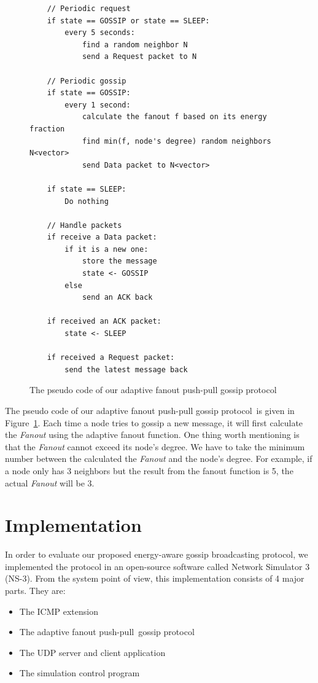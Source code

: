\documentclass[onehalf,11pt]{beavtex}
\newcommand{\gp}{gossip protocol}
\newcommand{\msg}{message}
\newcommand{\pp}{push-pull}
\begin{document}
\begin{figure}[!htbp]
	\centering
	\begin{Verbatim}
	// Periodic request 
	if state == GOSSIP or state == SLEEP:
		every 5 seconds:
			find a random neighbor N
			send a Request packet to N
	
	// Periodic gossip	
	if state == GOSSIP:
		every 1 second:
			calculate the fanout f based on its energy fraction
			find min(f, node's degree) random neighbors N<vector>
			send Data packet to N<vector>
	
	if state == SLEEP:
		Do nothing
	
	// Handle packets
	if receive a Data packet:
		if it is a new one:
			store the message
			state <- GOSSIP
		else
			send an ACK back
	
	if received an ACK packet:
		state <- SLEEP
	
	if received a Request packet:
		send the latest message back
	\end{Verbatim}
	\caption{The pseudo code of our adaptive fanout push-pull \gp}
	\label{fig:gossip}
\end{figure}
	
The pseudo code of our adaptive fanout push-pull \gp ~is given in Figure~\ref{fig:gossip}. Each time a node tries to gossip a new \msg, it will first calculate the \emph{Fanout} using the adaptive fanout function. One thing worth mentioning is that the \emph{Fanout} cannot exceed its node's degree. We have to take the minimum number between the calculated the \emph{Fanout} and the node's degree. For example, if a node only has 3 neighbors but the result from the fanout function is 5, the actual \emph{Fanout} will be 3.


\chapter{Implementation}
\label{Chapter4}

In order to evaluate our proposed energy-aware gossip broadcasting protocol, we implemented the protocol in an open-source software called Network Simulator 3 (NS-3). From the system point of view, this implementation consists of 4 major parts. They are:

\begin{itemize}
	\item The ICMP extension
	\item The adaptive fanout \pp ~\gp
	\item The UDP server and client application
	\item The simulation control program
\end{itemize}
\end{document}

